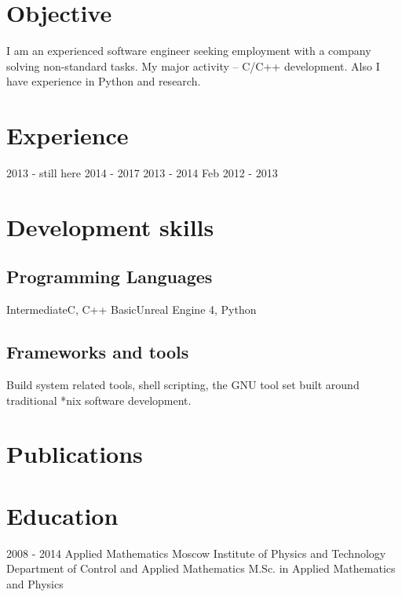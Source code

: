 \documentclass[11pt,a4paper]{moderncv}
\begin{document}
\maketitle

\section{Objective}
\cvitem {} {I am an experienced software engineer seeking employment with a company solving non-standard tasks. 
My major activity -- C/C++ development. Also I have experience in Python and research.}
\section{Experience}
\cventry
  {2013 - still here}
  {}
  {}
  {}
  {}
  {}
\cventry
  {2014 - 2017}
  {}
  {}
  {}
  {}
  {}
\cventry
  {2013 - 2014}
  {}
  {}
  {}
  {}
  {}
\cventry
  {Feb 2012 - 2013}
  {}
  {}
  {}
  {}
  {}

\section{Development skills}
\subsection{Programming Languages}
\cvitem
  {Intermediate}{C, C++}
\cvitem
  {Basic}{Unreal Engine 4, Python}

\subsection{Frameworks and tools}
 {Build system related tools, shell scripting, the GNU tool set built around
  traditional *nix software development.}

\section{Publications}
\section{Education}
  \cventry
    {2008 - 2014}
    {Applied Mathematics}
    {Moscow Institute of Physics and Technology} {}
    {Department of Control and Applied Mathematics}
    {M.Sc. in Applied Mathematics and Physics}
\end{document}
